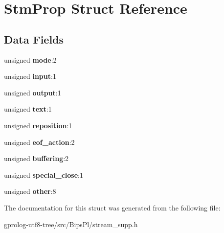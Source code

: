 \hypertarget{structStmProp}{}\section{Stm\+Prop Struct Reference}
\label{structStmProp}
\subsection*{Data Fields}
\begin{DoxyCompactItemize}
\item 
unsigned {\bfseries mode}\+:2\hypertarget{structStmProp_a8a2ef413513d1963d66e2f490b6b83b4}{}\label{structStmProp_a8a2ef413513d1963d66e2f490b6b83b4}

\item 
unsigned {\bfseries input}\+:1\hypertarget{structStmProp_a600c8a2fc85ea28e18dd45a1bfdbb039}{}\label{structStmProp_a600c8a2fc85ea28e18dd45a1bfdbb039}

\item 
unsigned {\bfseries output}\+:1\hypertarget{structStmProp_ac00a5a24dbbfeece3814be64cc7014d6}{}\label{structStmProp_ac00a5a24dbbfeece3814be64cc7014d6}

\item 
unsigned {\bfseries text}\+:1\hypertarget{structStmProp_ac19d8844240a9c3059104f8afd135834}{}\label{structStmProp_ac19d8844240a9c3059104f8afd135834}

\item 
unsigned {\bfseries reposition}\+:1\hypertarget{structStmProp_a812b9e484fea9756ace87645f847f6f4}{}\label{structStmProp_a812b9e484fea9756ace87645f847f6f4}

\item 
unsigned {\bfseries eof\+\_\+action}\+:2\hypertarget{structStmProp_a04e464b0b01bd6e61e4752dc40264126}{}\label{structStmProp_a04e464b0b01bd6e61e4752dc40264126}

\item 
unsigned {\bfseries buffering}\+:2\hypertarget{structStmProp_ad4122d8a077810116d89eb216c24e642}{}\label{structStmProp_ad4122d8a077810116d89eb216c24e642}

\item 
unsigned {\bfseries special\+\_\+close}\+:1\hypertarget{structStmProp_a77078202569393e5ac5b40c0e3b4e8af}{}\label{structStmProp_a77078202569393e5ac5b40c0e3b4e8af}

\item 
unsigned {\bfseries other}\+:8\hypertarget{structStmProp_a53b858c5848ca920087838eb02faf75f}{}\label{structStmProp_a53b858c5848ca920087838eb02faf75f}

\end{DoxyCompactItemize}


The documentation for this struct was generated from the following file\+:\begin{DoxyCompactItemize}
\item 
gprolog-\/utf8-\/tree/src/\+Bips\+Pl/stream\+\_\+supp.\+h\end{DoxyCompactItemize}
